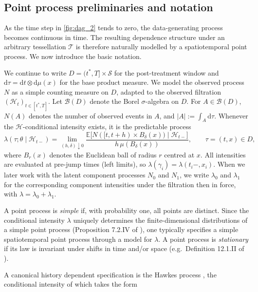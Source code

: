 \documentclass{statsoc}
\newcommand{\bbE}{\mathbb{E}}
\newcommand{\dd}{\mathrm{d}}
\newcommand{\1}{\mathbbm{1}}
\newcommand{\Fobs}{\mathcal H}
\newcommand{\Nproc}{N}
\newcommand{\Nzero}{N_0}
\newcommand{\None}{N_1}
\begin{document}
\subsection{Point process preliminaries and notation}\label{sec:notation}

As the time step in \cref{fig:dag_2} tends to zero, the data-generating process becomes continuous in time. The resulting dependence structure under an arbitrary tessellation \(\mathcal T\) is therefore naturally modelled by a spatiotemporal point process. We now introduce the basic notation.

We continue to write \(D=(t^\ast,T]\times\mathcal S\) for the post-treatment window and \(\dd\tau=\dd t\otimes\dd\mu(x)\) for the base product measure. We model the observed process \(\Nproc\) as a simple counting measure on \(D\), adapted to the observed filtration
\((\Fobs_t)_{t\in[t^\ast,T]}\). Let \(\mathcal B(D)\) denote the Borel \(\sigma\)-algebra on \(D\). For \(A\in\mathcal B(D)\), \(\Nproc(A)\) denotes the number of observed events in \(A\), and \(|A|:=\int_A \dd\tau\). Whenever the \(\Fobs\)-conditional intensity exists, it is the predictable process
\[
\lambda(\tau;\theta\mid\Fobs_{t-})
=\lim_{(h,\delta)\downarrow 0}
\frac{\bbE\big[\Nproc([t,t+h)\times B_\delta(x))\mid\Fobs_{t-}\big]}
{h\,\mu(B_\delta(x))},
\qquad \tau=(t,x)\in D,
\]
where \(B_r(x)\) denotes the Euclidean ball of radius \(r\) centred at \(x\). All intensities are evaluated at pre-jump times (left limits), so \(\lambda(\gamma_i)=\lambda(t_i-,x_i)\). When we later work with the latent component processes \(\Nzero\) and \(\None\), we write \(\lambda_0\) and \(\lambda_1\) for the corresponding component intensities under the filtration then in force, with \(\lambda=\lambda_0+\lambda_1\).


A point process is {\sl simple} if, with probability one, all points are distinct. Since the conditional intensity \(\lambda\) uniquely determines the finite-dimensional distributions of a simple point process (Proposition 7.2.IV of \citet{daley2003introduction}), one typically specifies a simple spatiotemporal point process through a model for \(\lambda\). A point process is {\sl stationary} if its law is invariant under shifts in time and/or space (e.g.\ Definition 12.1.II of \citet{daley2007introduction}).

A canonical history dependent specification is the Hawkes process \citep{Hawkes1,hawkes1974cluster}, the conditional intensity of which takes the form
\end{document}
